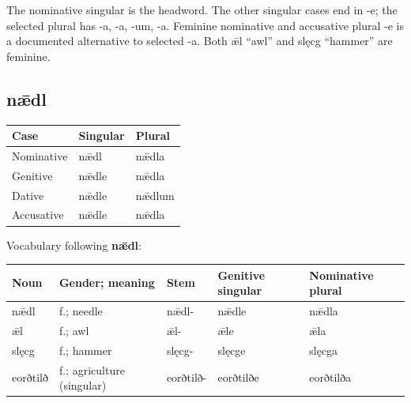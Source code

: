 The nominative singular is the headword. The other singular cases end in -e; the selected plural has -a, -a, -um, -a. Feminine nominative and accusative plural -e is a documented alternative to selected -a. Both ǣl “awl” and slęcg “hammer” are feminine.

\subsection*{nǣdl}

\par\begingroup
\fontsize{10.5}{13.2}\selectfont
\setlength{\LTleft}{0pt}\setlength{\LTright}{\fill}
\noindent
\begin{tabular}{@{}>{\raggedright\arraybackslash}p{39.46mm}>{\raggedright\arraybackslash}p{39.46mm}>{\raggedright\arraybackslash}p{39.46mm}@{}}
\toprule
\textbf{Case} & \textbf{Singular} & \textbf{Plural} \\
\midrule
Nominative & nǣdl & nǣdla \\
Genitive & nǣdle & nǣdla \\
Dative & nǣdle & nǣdlum \\
Accusative & nǣdle & nǣdla \\
\bottomrule
\end{tabular}
\par\endgroup

Vocabulary following \textbf{nǣdl}:

\par\begingroup
\fontsize{10.5}{13.2}\selectfont
\setlength{\LTleft}{0pt}\setlength{\LTright}{\fill}
\noindent
\begin{tabular}{@{}>{\raggedright\arraybackslash}p{17.76mm}>{\raggedright\arraybackslash}p{31.52mm}>{\raggedright\arraybackslash}p{17.76mm}>{\raggedright\arraybackslash}p{22.37mm}>{\raggedright\arraybackslash}p{23.35mm}@{}}
\toprule
\textbf{Noun} & \textbf{Gender; meaning} & \textbf{Stem} & \textbf{Genitive singular} & \textbf{Nominative plural} \\
\midrule
nǣdl & f.; needle & nǣdl- & nǣdle & nǣdla \\
ǣl & f.; awl & ǣl- & ǣle & ǣla \\
slęcg & f.; hammer & slęcg- & slęcge & slęcga \\
eorðtilð & f.; agriculture (singular) & eorðtilð- & eorðtilðe & eorðtilða \\
\bottomrule
\end{tabular}
\par\endgroup

